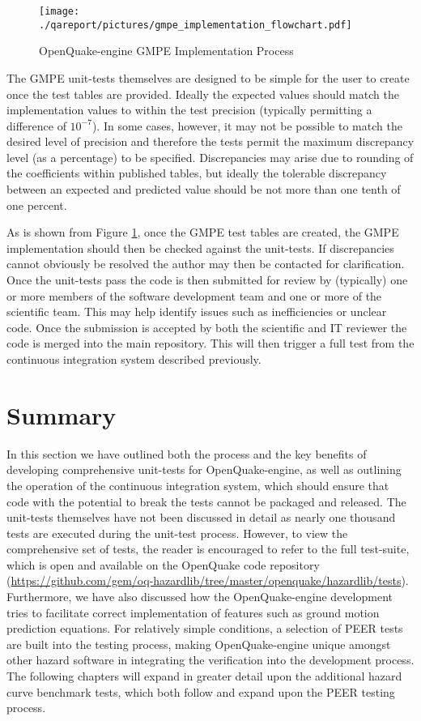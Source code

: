 \begin{figure}[htbp]
  \centering
  \texttt{[image: ./qareport/pictures/gmpe\_implementation\_flowchart.pdf]}
  \caption{OpenQuake-engine GMPE Implementation Process}
  \label{fig:gmpe_flowchart}
\end{figure}

The GMPE unit-tests themselves are designed to be simple for the user to
create once the test tables are provided. Ideally the expected values 
should match the implementation values to within the test precision 
(typically permitting a difference of $10^{-7}$).
In some cases, however, it may not be possible to match the desired level 
of precision and therefore the tests permit the maximum discrepancy level 
(as a percentage) to be specified. Discrepancies may arise due to rounding 
of the coefficients within published tables, but ideally the tolerable 
discrepancy between an expected and predicted value should be not more 
than one tenth of one percent.

As is shown from Figure \ref{fig:gmpe_flowchart}, once the GMPE test tables are
created, the GMPE implementation should then be checked against the unit-tests.
If discrepancies cannot obviously be resolved the author may then be contacted
for clarification. Once the unit-tests pass the code is then submitted for
review by (typically) one or more members of the software development team and
one or more of the scientific team. This may help identify issues such as
inefficiencies or unclear code. Once the submission is accepted by both the
scientific and IT reviewer the code is merged into the main repository.  This
will then trigger a full test from the continuous integration system described
previously.

%
\section{Summary}
In this section we have outlined both the process and the key benefits 
of developing comprehensive unit-tests for OpenQuake-engine, as well as 
outlining the operation of the continuous integration system, which
should ensure that code with the potential to break the tests cannot
be packaged and released. The unit-tests themselves have not been 
discussed in detail as nearly one thousand tests are executed during 
the unit-test process. However, to view the comprehensive set of tests,
the reader is encouraged to refer to the full test-suite, which is open 
and available on the OpenQuake code repository 
(\href{https://github.com/gem/oq-hazardlib/tree/master/openquake/hazardlib/tests}{https://github.com/gem/oq-hazardlib/tree/master/openquake/hazardlib/tests}). 
%
Furthermore, we have also discussed how the OpenQuake-engine development tries
to facilitate correct implementation of features such as ground motion
prediction equations. For relatively simple conditions, a selection of PEER
tests \citep{thomas2010} are built into the testing process, making
OpenQuake-engine unique amongst other hazard software in integrating the
verification into the development process. 
%
The following chapters will expand in greater detail upon the additional
hazard curve benchmark tests, which both follow and expand upon the 
PEER testing process.
